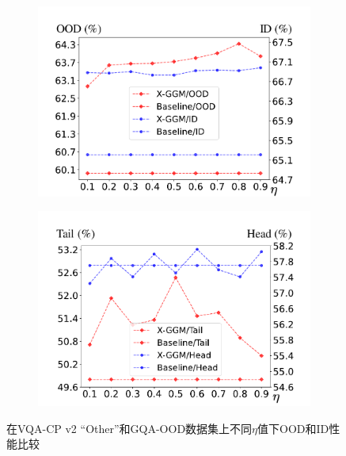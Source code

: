 \begin{figure}[!t]
\vspace{-6mm}
\begin{subfigure}[b]{0.495\linewidth}
\centering
\includegraphics[width=1.\linewidth]{figure/c3_hp_1.pdf}
\label{fig:c3_abl_param_1}
\end{subfigure}
\begin{subfigure}[b]{0.495\linewidth}
\centering
\includegraphics[width=1.\linewidth]{figure/c3_hp_2.pdf}
\label{fig:c3_abl_param_2}
\end{subfigure}
\caption{在VQA-CP v2 ``Other''和GQA-OOD数据集上不同$\eta$值下OOD和ID性能比较}
\label{fig:c3_abl_params}
\end{figure}

